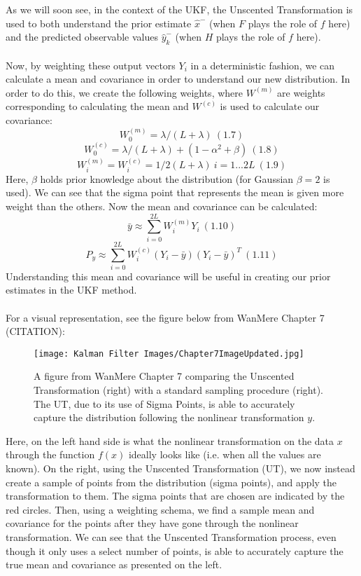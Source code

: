     As we will soon see, in the context of the UKF, the Unscented Transformation is used to both understand the prior estimate $\hat{x}^-$ (when $F$ plays the role of $f$ here) and the predicted observable values $\hat{y}_k^-$ (when $H$ plays the role of $f$ here).\\
    \\
    Now, by weighting these output vectors $Y_i$ in a deterministic fashion, we can calculate a mean and covariance in order to understand our new distribution. In order to do this, we create the following weights, where $W^{(m)}$ are weights corresponding to calculating the mean and $W^{(c)}$ is used to calculate our covariance:
    $$ W_0^{(m)} = \lambda/(L + \lambda)  \ (1.7)$$ 
    $$ W_0^{(c)} = \lambda/(L + \lambda) + (1 - \alpha^2 + \beta) \ (1.8) $$
    $$ W_i^{(m)} = W_i^{(c)} = 1/{2(L + \lambda)} \ i = 1 ... 2L \ (1.9) $$
    Here, $\beta$ holds prior knowledge about the distribution (for Gaussian $\beta = 2$ is used). We can see that the sigma point that represents the mean is given more weight than the others. Now the mean and covariance can be calculated:
    $$ \bar{y} \approx \sum_{i = 0}^{2L} W_i^{(m)} Y_i \ (1.10)$$
    $$ P_y \approx \sum_{i = 0}^{2L} W_i^{(c)}(Y_i - \bar{y})(Y_i - \bar{y})^T  \ (1.11)$$
    Understanding this mean and covariance will be useful in creating our prior estimates in the UKF method.
    \\
    \\
    For a visual representation, see the figure below from WanMere Chapter 7 (CITATION):\\
    \begin{figure} [H]
    \centering
    \texttt{[image: Kalman Filter Images/Chapter7ImageUpdated.jpg]}
    \caption{A figure from WanMere Chapter 7 comparing the Unscented Transformation (right) with a standard sampling procedure (right). The UT, due to its use of Sigma Points, is able to accurately capture the distribution following the nonlinear transformation $y$.}
    \end{figure}
    Here, on the left hand side is what the nonlinear transformation on the data $x$ through the function $f(x)$ ideally looks like (i.e. when all the values are known). On the right, using the Unscented Transformation (UT), we now instead create a sample of points from the distribution (sigma points), and apply the transformation to them. The sigma points that are chosen are indicated by the red circles. Then, using a weighting schema, we find a sample mean and covariance for the points after they have  gone through the nonlinear transformation. We can see that the Unscented Transformation process, even though it only uses a select number of points, is able to accurately capture the true mean and covariance as presented on the left. 
    
